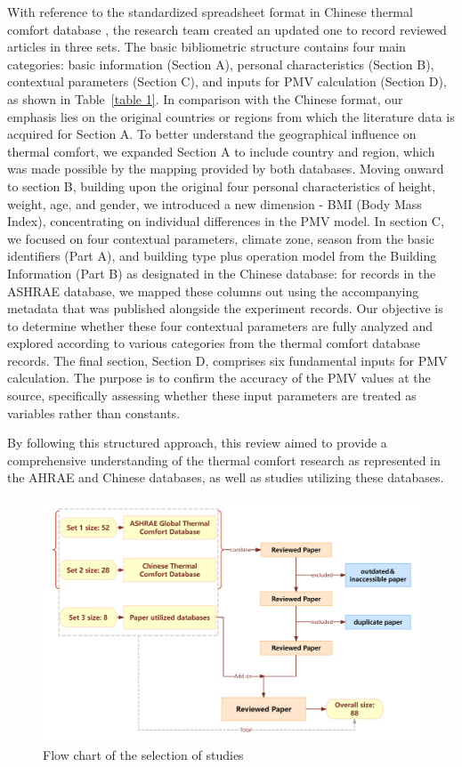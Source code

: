 \documentclass[final,3p,times,12pt]{elsarticle}
\begin{document}
With reference to the standardized spreadsheet format in Chinese thermal comfort database \cite{yangChineseThermalComfort2023}, the research team created an updated one to record reviewed articles in three sets. The basic bibliometric structure contains four main categories: basic information (Section A), personal characteristics (Section B), contextual parameters (Section C), and inputs for PMV calculation (Section D), as shown in Table~\ref{table 1}. In comparison with the Chinese format, our emphasis lies on the original countries or regions from which the literature data is acquired for Section A. To better understand the geographical influence on thermal comfort, we expanded Section A to include country and region, which was made possible by the mapping provided by both databases. Moving onward to section B, building upon the original four personal characteristics of height, weight, age, and gender, we introduced a new dimension - BMI (Body Mass Index), concentrating on individual differences in the PMV model. In section C, we focused on four contextual parameters, climate zone, season from the basic identifiers (Part A), and building type plus operation model from the Building Information (Part B) as designated in the Chinese database: for records in the ASHRAE database, we mapped these columns out using the accompanying metadata that was published alongside the experiment records. Our objective is to determine whether these four contextual parameters are fully analyzed and explored according to various categories from the thermal comfort database records. The final section, Section D, comprises six fundamental inputs for PMV calculation. The purpose is to confirm the accuracy of the PMV values at the source, specifically assessing whether these input parameters are treated as variables rather than constants.

By following this structured approach, this review aimed to provide a comprehensive understanding of the thermal comfort research as represented in the AHRAE and Chinese databases, as well as studies utilizing these databases.

\begin{figure}[h!]
    \centering
    \includegraphics[width=0.85\linewidth]{ab.png} 
    \caption{Flow chart of the selection of studies}
    \label{2}
\end{figure}
\end{document}
